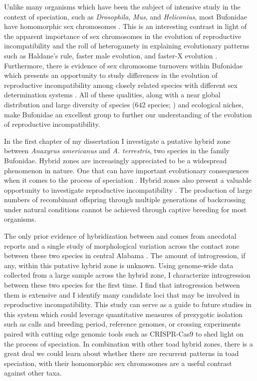 Unlike many organisms which have been the subject of intensive study in the 
context of speciation, such as \textit{Drosophila}, \textit{Mus}, and \textit{Heliconius},
most Bufonidae have homomorphic sex chromosomes \parencite{blair1972}.
This is an interesting contrast in light of the apparent importance of sex chromosomes
in the evolution of reproductive incompatibility and 
the roll of heterogamety in explaining evolutionary patterns such as Haldane's 
rule, faster male evolution, and faster-X evolution \parencite{delph2016}. 
Furthermore, there is evidence of sex chromosome turnovers within Bufonidae
which presents an opportunity to study differences in the evolution of  
reproductive incompatibility among closely related species with different 
sex determination systems \parencite{dufresnes2020,stock2011}. 
All of these qualities, along with a near global distribution and large diversity 
of species (642 species; \cite{amphibiaweb2023}) and ecological niches, make Bufonidae 
an excellent group to further our understanding of the evolution of reproductive 
incompatibility.



In the first chapter of my dissertation I investigate a putative hybrid zone between 
\textit{Anaxyrus americanus} and \textit{A. terrestris}, two species in 
the family Bufonidae. 
Hybrid zones are increasingly appreciated to be a widespread phenomenon in nature.
One that can have important evolutionary consequences when it comes to the
process of speciation \parencite{moran2021}.
Hybrid zones also present a valuable opportunity to investigate reproductive 
incompatibility \parencite{rieseberg1999}. 
The production of large numbers of recombinant offspring through multiple 
generations of backcrossing under natural conditions cannot be achieved
through captive breeding for most organisms.

The only prior evidence of hybridization between \amer and \terr comes from anecdotal reports
and a single study of morphological variation across the contact zone between
these two species in central Alabama \parencite{mount1975,weatherby1982}. 
The amount of introgression, if any, within this putative hybrid zone is unknown.
Using genome-wide data collected from a large sample across the hybrid zone, 
I characterize introgression between these two species for the first time.  
I find that introgression between them is extensive and I identify many 
candidate loci that may be involved in reproductive incompatibility.
This study can serve as a guide to future studies in this system which could 
leverage quantitative measures of prezygotic isolation such 
as calls and breeding period, reference genomes, or crossing experiments paired
with cutting edge genomic tools such as CRISPR-Cas9 to shed light on the process
of speciation. 
In combination with other toad hybrid zones, there is a great deal we could 
learn about whether there are recurrent patterns in toad speciation, with
their homomorphic sex chromosomes are a useful contrast against other taxa.

